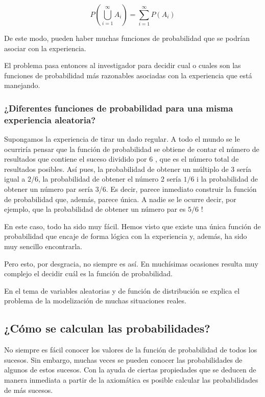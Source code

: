\documentclass[
]{article}
\begin{document}
\[
P\left(\bigcup_{i=1}^{\infty} A_{i}\right)=\sum_{i=1}^{\infty} P\left(A_{i}\right)
\]

De este modo, pueden haber muchas funciones de probabilidad que se
podrían asociar con la experiencia.

El problema pasa entonces al investigador para decidir cual o cuales son
las funciones de probabilidad más razonables asociadas con la
experiencia que está manejando.

\subsubsection{¿Diferentes funciones de probabilidad para una misma experiencia aleatoria?}\label{diferentes-funciones-de-probabilidad-para-una-misma-experiencia-aleatoria}

Supongamos la experiencia de tirar un dado regular. A todo el mundo se
le ocurriría pensar que la función de probabilidad se obtiene de contar
el número de resultados que contiene el suceso dividido por 6 , que es
el número total de resultados posibles. Así pues, la probabilidad de
obtener un múltiplo de 3 sería igual a \(2 / 6\), la probabilidad de
obtener el número 2 sería \(1 / 6\) i la probabilidad de obtener un número
par sería 3/6. Es decir, parece inmediato construir la función de
probabilidad que, además, parece única. A nadie se le ocurre decir, por
ejemplo, que la probabilidad de obtener un número par es \(5 / 6\) !

En este caso, todo ha sido muy fácil. Hemos visto que existe una única
función de probabilidad que encaje de forma lógica con la experiencia y,
además, ha sido muy sencillo encontrarla.

Pero esto, por desgracia, no siempre es así. En muchísimas ocasiones
resulta muy complejo el decidir cuál es la función de probabilidad.

En el tema de variables aleatorias y de función de distribución se
explica el problema de la modelización de muchas situaciones reales.

\subsection{¿Cómo se calculan las probabilidades?}\label{cuxf3mo-se-calculan-las-probabilidades}

No siempre es fácil conocer los valores de la función de probabilidad de
todos los sucesos. Sin embargo, muchas veces se pueden conocer las
probabilidades de algunos de estos sucesos. Con la ayuda de ciertas
propiedades que se deducen de manera inmediata a partir de la axiomática
es posible calcular las probabilidades de más sucesos.
\end{document}
